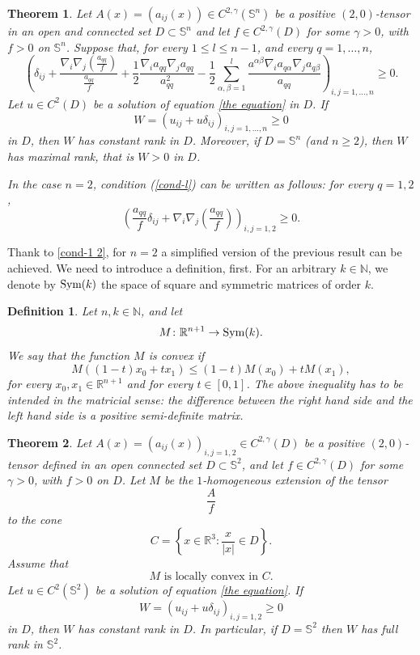 \documentclass[12pt]{amsart}
\newtheorem{thm}{Theorem}[section]
\newtheorem{definition}[theorem]{Definition}
\newcommand{\R}{\mathbb R}
\newcommand{\N}{\mathbb N}
\newcommand{\1}{\mathbf 1}
\newcommand{\s}{\mathbb S}
\newcommand{\symm}{\mbox{\rm Sym}}
\begin{document}
\begin{thm}\label{main theorem} Let $A(x)=(a_{ij}(x))\in C^{2,\gamma}(\s^n)$ be a positive $(2,0)$-tensor in an open and connected set $D\subset \s^n$ and let $f\in C^{2, \gamma}(D)$ for some $\gamma>0$, with $f>0$ on $\s^n$. Suppose that, for every $1\le l\le n-1$, and every $q=1,\dots,n$,
\begin{equation}\label{cond-l} 
\left(\delta_{ij}+ \frac{\nabla_i \nabla_j (\frac{a_{qq}}{f})}{\frac{a_{qq}}{f}}+\frac12\frac{\nabla_ia_{qq}\nabla_ja_{qq}}{a^2_{qq}}-\frac12\sum_{\alpha,\beta=1}^l \frac{a^{\alpha\beta}\nabla_ia_{q\alpha}\nabla_ja_{q\beta}}{a_{qq}}\right)_{i,j=1,\dots,n}\ge 0.
\end{equation}
Let $u\in C^2(D)$ be a solution of equation \eqref{the equation} in $D$. If 
\[
W=(u_{ij}+u\delta_{ij})_{i,j=1,\dots,n}\ge 0
\] 
in $D$, then $W$ has constant rank in $D$. Moreover, if $D=\s^n$ (and $n\ge2$), then $W$ has maximal rank, that is $W>0$ in $D$.

In the case $n=2$, condition (\ref{cond-l}) can be written as follows: for every $q=1,2$,
\begin{equation}\label{cond-1 2} 
\left(\frac{a_{qq}}f\delta_{ij}+ \nabla_i\nabla_j\left(\frac{a_{qq}}{f}\right)\right)_{i,j=1,2}\ge 0.
\end{equation}
\end{thm}

Thank to \eqref{cond-1 2}, for $n=2$ a simplified version of the previous result can be achieved. We need to introduce a definition, first. For an arbitrary $k\in\N$, we denote by $\symm(k)$ the space of square and symmetric matrices of order $k$.

\begin{definition} Let $n,k\in\N$, and let
$$
M\colon\R^{n+1}\to\symm(k).
$$
We say that the function $M$ is convex if
$$
M((1-t)x_0+tx_1)\le(1-t)M(x_0)+tM(x_1),
$$
for every $x_0, x_1\in\R^{n+1}$ and for every $t\in[0,1]$. The above inequality has to be intended in the matricial sense: the difference between the right hand side and the left hand side is a positive semi-definite matrix. 
\end{definition}

\begin{thm}\label{main theorem n=2 rephrased} Let $A(x)=(a_{ij}(x))_{i,j=1,2}\in C^{2,\gamma}(D)$ be a positive $(2,0)$-tensor defined in an open connected set $D\subset\s^2$, and let $f\in C^{2, \gamma}(D)$ for some $\gamma>0$, with $f>0$ on $D$. Let $M$ be the $1$-homogeneous extension of the tensor
$$
\frac{A}{f}
$$
to the cone 
$$
C=\left\{x\in\R^3\colon\frac{x}{|x|}\in D\right\}.
$$
Assume that  
\begin{equation}\label{the condition}
M\mbox{ is locally convex in $C$}.
\end{equation}
Let $u\in C^2(\s^2)$ be a solution of equation \eqref{the equation}. If  
\[
W=(u_{ij}+u\delta_{ij})_{i,j=1,2}\ge 0
\] 
in $D$, then $W$ has constant rank in $D$. In particular, if $D=\s^2$ then $W$ has full rank in $\s^2$. 
\end{thm}
\end{document}
